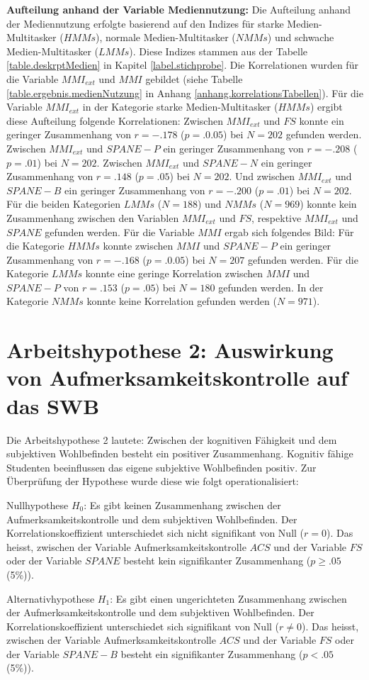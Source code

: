 \textbf{Aufteilung anhand der Variable Mediennutzung:} Die Aufteilung anhand der Mediennutzung erfolgte basierend auf den Indizes für starke Medien-Multitasker ($HMMs$), normale Medien-Multitasker ($NMMs$) und schwache Medien-Multitasker ($LMMs$). Diese Indizes stammen aus der Tabelle \ref{table.deskrptMedien} in Kapitel \ref{label.stichprobe}. Die Korrelationen wurden für die Variable $MMI_{ext}$ und $MMI$ gebildet (siehe Tabelle \ref{table.ergebnis.medienNutzung} in Anhang \ref{anhang.korrelationsTabellen}). Für die Variable $MMI_{ext}$ in der Kategorie starke Medien-Multitasker ($HMMs$) ergibt diese Aufteilung folgende Korrelationen: Zwischen $MMI_{ext}$ und $FS$ konnte ein geringer Zusammenhang von $r=-.178$ ($p=.0.05$) bei $N=202$ gefunden werden. Zwischen $MMI_{ext}$ und $SPANE-P$ ein geringer Zusammenhang von $r=-.208$ ($p=.01$) bei $N=202$. Zwischen $MMI_{ext}$ und $SPANE-N$ ein geringer Zusammenhang von $r=.148$ ($p=.05$) bei $N=202$. Und zwischen $MMI_{ext}$ und $SPANE-B$ ein geringer Zusammenhang von $r=-.200$ ($p=.01$) bei $N=202$. Für die beiden Kategorien $LMMs$ ($N=188$) und $NMMs$ ($N=969$) konnte kein Zusammenhang zwischen den Variablen $MMI_{ext}$ und $FS$, respektive $MMI_{ext}$ und $SPANE$ gefunden werden. Für die Variable $MMI$ ergab sich folgendes Bild: Für die Kategorie $HMMs$ konnte zwischen $MMI$ und $SPANE-P$ ein geringer Zusammenhang von $r=-. 168$ ($p=.0.05$) bei $N=207$ gefunden werden. Für die Kategorie $LMMs$ konnte eine geringe Korrelation zwischen $MMI$ und $SPANE-P$ von $r=.153$ ($p=.05$) bei $N=180$ gefunden werden. In der Kategorie $NMMs$ konnte keine Korrelation gefunden werden ($N=971$).

\section{Arbeitshypothese 2: Auswirkung von Aufmerksamkeitskontrolle auf das SWB}\label{label.ergebnisse.arbeitshypothese2}
Die Arbeitshypothese 2 lautete: Zwischen der kognitiven Fähigkeit  und dem subjektiven Wohlbefinden besteht ein positiver Zusammenhang. Kognitiv fähige Studenten beeinflussen das eigene subjektive Wohlbefinden positiv. Zur Überprüfung der Hypothese wurde diese wie folgt operationalisiert:
\par
Nullhypothese $H_{0}$: Es gibt keinen Zusammenhang zwischen der Aufmerksamkeitskontrolle und dem subjektiven Wohlbefinden. Der Korrelationskoeffizient unterschiedet sich nicht signifikant von Null ($r=0$). Das heisst, zwischen der Variable Aufmerksamkeitskontrolle $ACS$ und der Variable $FS$ oder der Variable $SPANE$ besteht kein signifikanter Zusammenhang ($p \geq .05$ (5\%)).
\par
Alternativhypothese $H_{1}$: Es gibt einen ungerichteten Zusammenhang zwischen der Aufmerksamkeitskontrolle und dem subjektiven Wohlbefinden. Der Korrelationskoeffizient unterschiedet sich signifikant von Null ($r \neq 0$). Das heisst, zwischen der Variable Aufmerksamkeitskontrolle $ACS$ und der Variable $FS$ oder der Variable $SPANE-B$ besteht ein signifikanter Zusammenhang ($p < .05$ (5\%)).

